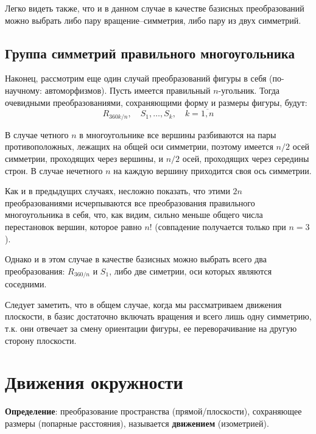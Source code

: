 Легко видеть также, что и в данном случае в качестве базисных преобразований можно выбрать либо пару вращение--симметрия, либо пару из двух симметрий.



\subsection{Группа симметрий правильного многоугольника}

Наконец, рассмотрим еще один случай преобразований фигуры в себя (по-научному: автоморфизмов). Пусть имеется правильный $n$-угольник. Тогда очевидными преобразованиями, сохраняющими форму и размеры фигуры, будут:
$$
R_{360k/n},\quad S_1,\dots, S_k,\quad k=\overline{1,n}
$$

В случае четного $n$ в многоугольнике все вершины разбиваются на пары противоположных, лежащих на общей оси симметрии, поэтому имеется $n/2$ осей симметрии, проходящих через вершины, и $n/2$ осей, проходящих через середины строн. В случае нечетного $n$ на каждую вершину приходится своя ось симметрии.

Как и в предыдущих случаях, несложно показать, что этими $2n$ преобразованиями исчерпываются все преобразования правильного многоугольника в себя, что, как видим, сильно меньше общего числа перестановок вершин, которое равно $n!$ (совпадение получается только при $n=3$).

Однако и в этом случае в качестве базисных можно выбрать всего два преобразования: $R_{360/n}$ и $S_1$, либо две симетрии, оси которых являются соседними.

Следует заметить, что в общем случае, когда мы рассматриваем движения плоскости, в базис достаточно включать вращения и всего лишь одну симметрию, т.к. они отвечает за смену ориентации фигуры, ее переворачивание на другую сторону плоскости.





\section{Движения окружности}
 

\textbf{Определение}: преобразование пространства (прямой/плоскости), сохраняющее размеры (попарные расстояния), называется \textbf{движением} (изометрией).

